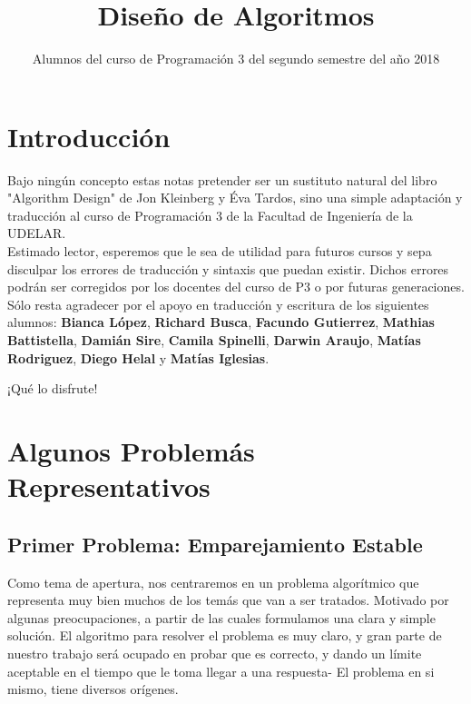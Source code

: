 \documentclass[a4paper]{article}
\title{Diseño de Algoritmos}
\author{Alumnos del curso de Programación 3 del segundo semestre del año 2018}
\begin{document}
\maketitle	
\newpage  
\tableofcontents
\newpage

\newpage





\section*{Introducción}

Bajo ningún concepto estas notas pretender ser un sustituto natural del libro "Algorithm Design" de Jon Kleinberg y Éva Tardos, sino una simple adaptación y traducción al curso de Programación 3 de la Facultad de Ingeniería de la UDELAR. \\

Estimado lector, esperemos que le sea de utilidad para futuros cursos y sepa disculpar los errores de traducción y sintaxis que puedan existir. Dichos errores podrán ser corregidos por los docentes del curso de P3 o por futuras generaciones.\\

Sólo resta agradecer por el apoyo en traducción y escritura de los siguientes alumnos: \textbf{Bianca López}, \textbf{Richard Busca}, \textbf{Facundo Gutierrez},\textbf{ Mathias Battistella}, \textbf{Damián Sire}, \textbf{Camila Spinelli}, \textbf{Darwin Araujo},  \textbf{Matías Rodriguez}, \textbf{Diego Helal} y \textbf{Matías Iglesias}. \\

\begin{center}
\huge{¡Qué lo disfrute!}
\end{center}



\newpage

\section{ Algunos Problemás Representativos}
\subsection{Primer Problema: Emparejamiento Estable}
Como tema de apertura, nos centraremos en un problema algorítmico que representa muy bien muchos de los temás que van a ser tratados. Motivado por algunas preocupaciones, a partir de las cuales formulamos una clara y simple solución. El algoritmo para resolver el problema es muy claro,  y gran parte de nuestro trabajo será ocupado en probar que es correcto, y dando un límite aceptable en el tiempo que le toma llegar a una respuesta- El problema en si mismo, tiene diversos orígenes.
\end{document}
